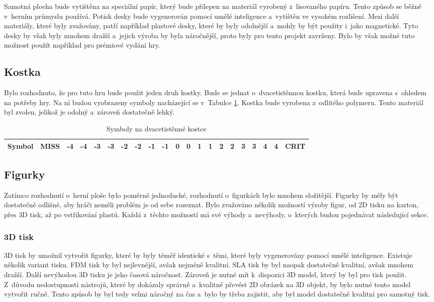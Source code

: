 Samotná plocha bude vytištěna na speciální papír, který bude přilepen na materiál vyrobený z~lisovaného papíru. Tento způsob se běžně v~herním průmyslu používá. Potisk desky bude vygenerován pomocí umělé inteligence a~vytištěn ve vysokém rozlišení. Mezi další materiály, které byly zvažovány, patří například plastové desky, které by byly odolnější a~mohly by být použity i~jako magnetické. Tyto desky by však byly mnohem dražší a~jejich výroba by byla náročnější, proto byly pro tento projekt zavrženy. Bylo by však možné tuto možnost použít například pro prémiové vydání hry.

\subsection{Kostka}
Bylo rozhodnuto, že pro tuto hru bude použit jeden druh kostky. Bude se jednat o~dvacetistěnnou kostku, která bude upravena s~ohledem na potřeby hry. Na ní budou vyobrazeny symboly nacházející se v~Tabulce \ref{tab:dice_symbols}. Kostka bude vyrobena z~odlitého polymeru. Tento materiál byl zvolen, jelikož je odolný a~zároveň dostatečně lehký.

\begin{table}[H]
    \centering
    \begin{tabular}{*{21}{c}}
        \toprule
        \multicolumn{1}{c|}{\textbf{Symbol}} & MISS & -4 & -4 & -3 & -3 & -2 & -2 & -1 & -1 & 0 & 0 & 1 & 1 & 2 & 2 & 3 & 3 & 4 & 4 & CRIT \\
        \bottomrule
    \end{tabular}
    \caption{Symboly na dvacetistěnné kostce}
    \label{tab:dice_symbols}
\end{table}

\subsection{Figurky}
Zatímco rozhodnutí o~herní ploše bylo poměrně jednoduché, rozhodnutí o~figurkách bylo mnohem složitější. Figurky by měly být dostatečně odlišné, aby hráči neměli problém je od sebe rozeznat. Bylo zvažováno několik možností výroby figur, od 2D tisku na karton, přes 3D tisk, až po vstřikování plastů. Každá z~těchto možností má své výhody a~nevýhody, o~kterých budou pojednávat následující sekce.

\subsubsection*{3D tisk}
3D tisk by umožnil vytvořit figurky, které by byly téměř identické s~těmi, které byly vygenerovány pomocí umělé inteligence. Existuje několik variant tisku. FDM tisk by byl nejlevnější, avšak nejméně kvalitní. SLA tisk by byl naopak dostatečně kvalitní, avšak mnohem dražší. Další nevýhodou 3D tisku je jeho časová náročnost. Zároveň je nutné mít k~dispozici 3D model, který by byl pro tisk použit. Z~důvodu nedostupnosti nástrojů, které by dokázaly správně a~kvalitně převést 2D obrázek na 3D objekt, by bylo nutné tento model vytvořit ručně. Tento způsob by byl tedy velmi náročný na čas a~bylo by třeba zajistit, aby byl model dostatečně kvalitní pro samotný tisk.

